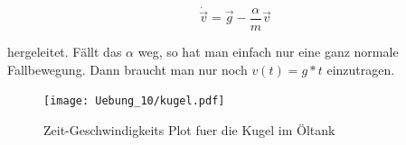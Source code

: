 \begin{equation*}
\dot{\vec{v}} = \vec{g} - \frac{\alpha}{m} \vec{v}
\end{equation*}

hergeleitet. Fällt das $\alpha$ weg, so hat man einfach nur eine ganz normale Fallbewegung. Dann braucht man nur noch $v(t) = g*t$ einzutragen.

\begin{figure}[h]
\begin{center}
\texttt{[image: Uebung\_10/kugel.pdf]}
\caption{Zeit-Geschwindigkeits Plot fuer die Kugel im Öltank}
\end{center}
\end{figure}

